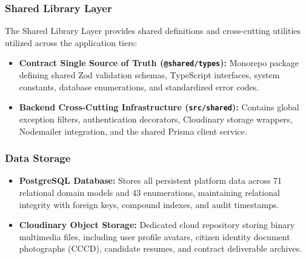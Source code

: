 \subsubsection*{Shared Library Layer}
The Shared Library Layer provides shared definitions and cross-cutting utilities utilized across the application tiers:
\begin{itemize}[leftmargin=*]
    \item \textbf{Contract Single Source of Truth (\texttt{@shared/types}):} Monorepo package defining shared Zod validation schemas, TypeScript interfaces, system constants, database enumerations, and standardized error codes.
    \item \textbf{Backend Cross-Cutting Infrastructure (\texttt{src/shared}):} Contains global exception filters, authentication decorators, Cloudinary storage wrappers, Nodemailer integration, and the shared Prisma client service.
\end{itemize}

\subsubsection*{Data Storage}
\begin{itemize}[leftmargin=*]
    \item \textbf{PostgreSQL Database:} Stores all persistent platform data across 71 relational domain models and 43 enumerations, maintaining relational integrity with foreign keys, compound indexes, and audit timestamps.
    \item \textbf{Cloudinary Object Storage:} Dedicated cloud repository storing binary multimedia files, including user profile avatars, citizen identity document photographs (CCCD), candidate resumes, and contract deliverable archives.
\end{itemize}

